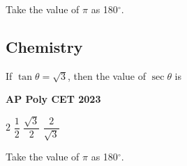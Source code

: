 \documentclass[11pt,paper=a4,answers]{exam}
\begin{document}
\begin{center}
\Large{Take the value of $\pi$ as 180${^\circ}$.}
\end{center}

\newpage















\subsection*{Chemistry}
\begin{multicols}{2}
\begin{questions}
\question
If $\tan  \theta = \sqrt{3}$, then the value of $\sec \theta$ is
\begin{flushright}
\small\textbf{AP Poly CET 2023}
\end{flushright}


\begin{choices}
\choice $\displaystyle 2$ 
\choice $\displaystyle \dfrac{1}{2}$ 
\choice $\displaystyle \dfrac{\sqrt{3}}{2}$ 
\choice $\displaystyle \dfrac{2}{\sqrt{3}}$  
\end{choices}
\end{questions}

\end{multicols}

\begin{center}
\Large{Take the value of $\pi$ as 180${^\circ}$.}
\end{center}

\newpage
\end{document}
